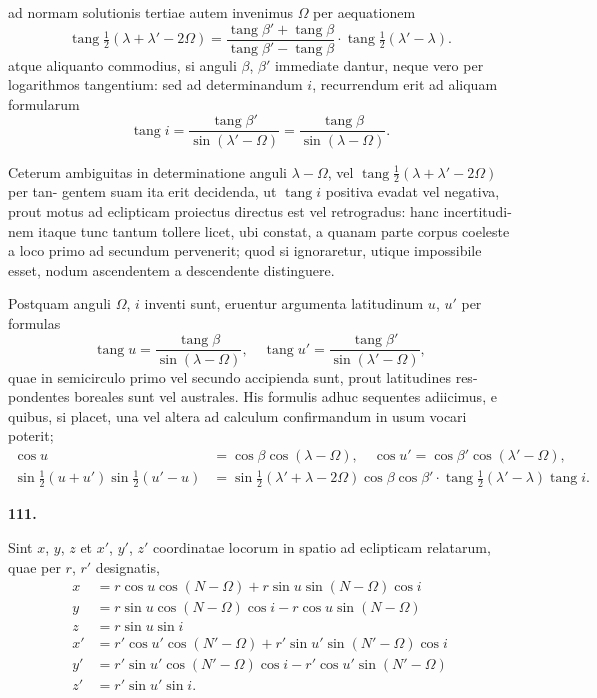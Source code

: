 \documentclass[12pt,a4paper]{article}
\DeclareMathOperator{\tang}{tang}
\begin{document}
ad normam solutionis tertiae autem invenimus $\Omega$ per aequationem
\[
\tang\tfrac{1}{2}(\lambda + \lambda' - 2\Omega) = \frac{\tang\beta' + \tang\beta}{\tang\beta' - \tang\beta} \cdot \tang\tfrac{1}{2}(\lambda' - \lambda).
\]
atque aliquanto commodius, si anguli $\beta$, $\beta'$ immediate dantur, neque vero per
logarithmos tangentium: sed ad determinandum $i$, recurrendum erit ad aliquam
formularum
\[
\tang i = \frac{\tang\beta'}{\sin(\lambda' - \Omega)} = \frac{\tang\beta}{\sin(\lambda - \Omega)}.
\]

Ceterum ambiguitas in determinatione anguli $\lambda - \Omega$, vel
$\tang\tfrac{1}{2}(\lambda + \lambda' - 2\Omega)$ per tan-
gentem suam ita erit decidenda, ut $\tang i$ positiva evadat vel negativa, prout
motus ad eclipticam proiectus directus est vel retrogradus: hanc incertitudi-
nem itaque tunc tantum tollere licet, ubi constat, a quanam parte corpus
coeleste a loco primo ad secundum pervenerit; quod si ignoraretur, utique
impossibile esset, nodum ascendentem a descendente distinguere.

Postquam anguli $\Omega$, $i$ inventi sunt, eruentur argumenta latitudinum $u$, $u'$
per formulas
\[
\tang u = \frac{\tang\beta}{\sin(\lambda - \Omega)}, \quad \tang u' = \frac{\tang\beta'}{\sin(\lambda' - \Omega)},
\]
quae in semicirculo primo vel secundo accipienda sunt, prout latitudines res-
pondentes boreales sunt vel australes. His formulis adhuc sequentes adiicimus,
e quibus, si placet, una vel altera ad calculum confirmandum in usum vocari
poterit;
\begin{align*}
\cos u &= \cos\beta\cos(\lambda - \Omega), \quad \cos u' = \cos\beta'\cos(\lambda' - \Omega), \\
\sin\tfrac{1}{2}(u + u')\sin\tfrac{1}{2}(u' - u) &= \sin\tfrac{1}{2}(\lambda' + \lambda - 2\Omega)\cos\beta\cos\beta' \cdot \tang\tfrac{1}{2}(\lambda' - \lambda)\tang i.
\end{align*}

\bigskip
\noindent\textbf{111.}

Sint $x$, $y$, $z$ et $x'$, $y'$, $z'$ coordinatae locorum in spatio ad eclipticam relatarum,
quae per $r$, $r'$ designatis,
\begin{align*}
x &= r\cos u\cos(N - \Omega) + r\sin u\sin(N - \Omega)\cos i \\
y &= r\sin u\cos(N - \Omega)\cos i - r\cos u\sin(N - \Omega) \\
z &= r\sin u\sin i \\
x' &= r'\cos u'\cos(N' - \Omega) + r'\sin u'\sin(N' - \Omega)\cos i \\
y' &= r'\sin u'\cos(N' - \Omega)\cos i - r'\cos u'\sin(N' - \Omega) \\
z' &= r'\sin u'\sin i.
\end{align*}
\end{document}

